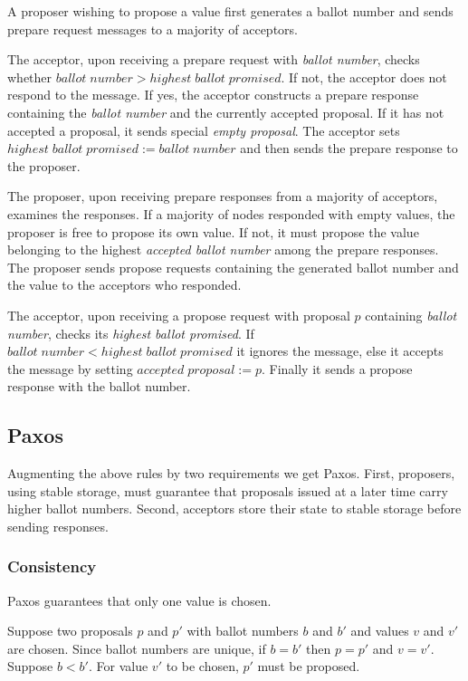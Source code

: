 \documentclass[12pt]{article}
\begin{document}
A proposer wishing to propose a value first generates a ballot number and sends prepare request messages to a majority of acceptors.

The acceptor, upon receiving a prepare request with \emph{ballot number}, checks whether $ballot \; number > highest \; ballot \; promised$. If not, the acceptor does not respond to the message.
If yes, the acceptor constructs a prepare response containing the \emph{ballot number} and the currently accepted proposal. If it has not accepted a proposal, it sends special \emph{empty proposal}. The acceptor sets $highest \; ballot \; promised := ballot \; number$ and then sends the prepare response to the proposer.

The proposer, upon receiving prepare responses from a majority of acceptors, examines the responses. If a majority of nodes responded with empty values, the proposer is free to propose its own value. If not, it must propose the value belonging to the highest \emph{accepted ballot number} among the prepare responses. The proposer sends propose requests containing the generated ballot number and the value to the acceptors who responded.

The acceptor, upon receiving a propose request with proposal $p$ containing \emph{ballot number}, checks its \emph{highest ballot promised}. If $ballot \; number < highest \; ballot \; promised$ it ignores the message, else it accepts the message by setting
$accepted \; proposal := p$.
Finally it sends a propose response with the ballot number.

\subsection{ Paxos }

Augmenting the above rules by two requirements we get Paxos. First, proposers, using stable storage, must guarantee that proposals issued at a later time carry higher ballot numbers. Second, acceptors store their state to stable storage before sending responses.

\subsubsection{ Consistency } Paxos guarantees that only one value is chosen.

Suppose two proposals $p$ and $p'$ with ballot numbers $b$ and $b'$ and values $v$ and $v'$ are chosen. Since ballot numbers are unique, if $b = b'$ then $p = p'$ and $v = v'$. Suppose $b < b'$. For value $v'$ to be chosen, $p'$ must be proposed.
\end{document}
